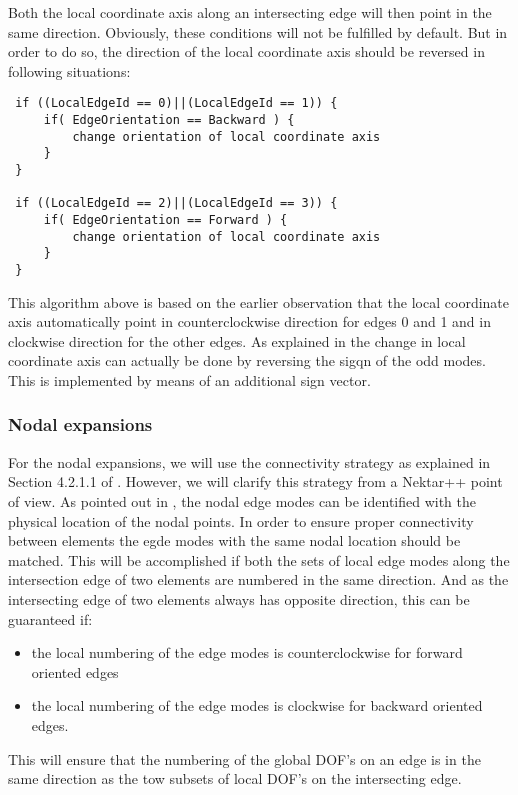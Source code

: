 Both the local coordinate axis along an intersecting edge will then point in the
same direction. Obviously, these conditions will not be fulfilled by default.
But in order to do so, the direction of the local coordinate axis should be
reversed in following situations:
\begin{lstlisting}
 if ((LocalEdgeId == 0)||(LocalEdgeId == 1)) {
     if( EdgeOrientation == Backward ) {
         change orientation of local coordinate axis
     }
 }

 if ((LocalEdgeId == 2)||(LocalEdgeId == 3)) {
     if( EdgeOrientation == Forward ) {
         change orientation of local coordinate axis
     }
 }
\end{lstlisting}
This algorithm above is based on the earlier observation that the local
coordinate axis automatically point in counterclockwise direction for edges 0
and 1 and in clockwise direction for the other edges. As explained in \cite{KaSh05}
the change in local coordinate axis can actually be done by reversing the sigqn
of the odd modes. This is implemented by means of an additional sign vector.

\subsubsection{Nodal expansions}

For the nodal expansions, we will use the connectivity strategy as explained in
Section 4.2.1.1 of \cite{KaSh05}. However, we will clarify this strategy from a
Nektar++ point of view. As pointed out in \cite{KaSh05}, the nodal edge modes
can be identified with the physical location of the nodal points. In order to ensure
proper connectivity between elements the egde modes with the same nodal location
should be matched. This will be accomplished if both the sets of local edge
modes along the intersection edge of two elements are numbered in the same
direction. And as the intersecting edge of two elements always has opposite
direction, this can be guaranteed if:
\begin{itemize}
\item the local numbering of the edge modes is counterclockwise for forward
 oriented edges
\item the local numbering of the edge modes is clockwise for backward oriented
edges.
\end{itemize}

This will ensure that the numbering of the global DOF's on an edge is in the
same direction as the tow subsets of local DOF's on the intersecting edge.

